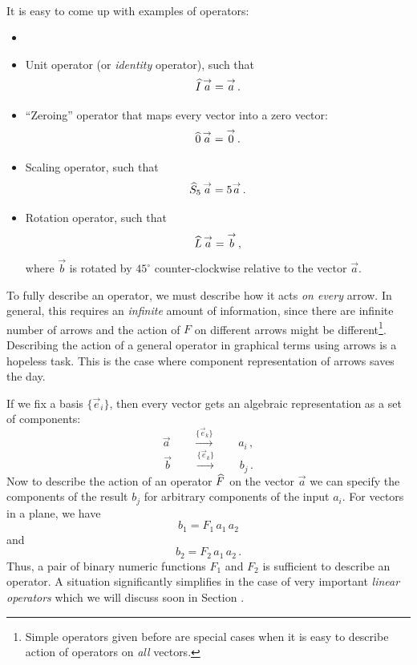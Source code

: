 \begin{bio}\faBook\,\,\\
It is easy to come up with examples of operators:

\begin{itemize}
\item\phantom{x}

\item Unit operator (or \emph{identity} operator), such that
  \[
  \widehat{I}\,\overset{\rightarrow}{a}=\overset{\rightarrow}{a}\,.
  \]

\item ``Zeroing'' operator that maps every vector into a zero
  vector:
  \[
  \widehat{0}\, \overset{\rightarrow}{a} = \overset{\rightarrow}{0}\,.
  \]

\item Scaling operator, such that
  \[
  \widehat{S}_5\,\overset{\rightarrow}{a} = 5\overset{\rightarrow}{a}\,.
  \]

\item Rotation operator, such that
  \[
  \widehat{L}\,\overset{\rightarrow}{a} = \overset{\rightarrow}{b}\,,
  \]
  where $\vec{b}$ is rotated by $45^\circ$ counter-clockwise relative to the
  vector $\vec{a}$.

\end{itemize}
\end{bio}


To fully describe an operator, we must describe how it acts \emph{on
every} arrow. In general, this
requires an \emph{infinite} amount of information, since there are
infinite number of arrows and the action of $F$ on different arrows
might be different\footnote{Simple operators given before are special
cases when it is easy to describe action of operators on \emph{all}
vectors.}. Describing the action of a general operator in
graphical terms using arrows is a hopeless task. This is the case
where component
representation of arrows saves the day.

If we fix a basis $\lbrace \vec{e}_i\rbrace$, then every vector gets
an algebraic representation as a set of components:
\[
\vec{a}\qquad\overset{\lbrace \vec{e}_k\rbrace}{\longrightarrow}\qquad a_i\,,
\]
\[
\vec{b}\qquad\overset{\lbrace \vec{e}_k\rbrace}{\longrightarrow}\qquad b_j\,.
\]
Now to describe the action of an operator $\widehat{F}$ on the vector
$\vec{a}$ we can specify the components of the result $b_j$ for
arbitrary components of the input $a_i$. For vectors in a plane, we have
\[
b_1 = F_{1}\,a_{1}\, a_2
\]
and
\[
b_2 = F_{2}\,a_1\,a_{2}\,.
\]
Thus, a pair of binary numeric functions $F_{1}$ and $F_{2}$ is
sufficient to describe an operator. A situation significantly
simplifies in the case of very important \emph{linear operators} which
we will discuss soon in Section \label{sec:LinearOperators}.


